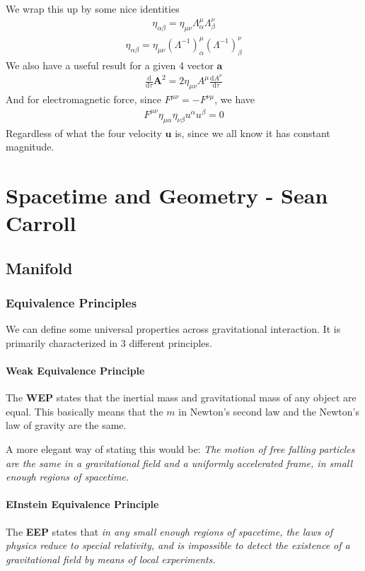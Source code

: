 \documentclass[12pt]{book}
\newcommand{\dydx}[2]{\frac{\text{d} #1}{\text{d} #2}}
\newcommand{\paren}[1]{\left( #1 \right)}
\newcommand{\etensor}[3]{#1_{#3}^{#2}}
\begin{document}
We wrap this up by some nice identities
\begin{align}
\eta_{\alpha\beta}=\eta_{\mu\nu}\etensor{\Lambda}{\mu}{\alpha}\etensor{\Lambda}{\nu}{\beta}
\end{align}
\begin{align}
\eta_{\alpha\beta}=\eta_{\mu\nu}\etensor{\paren{\Lambda^{-1}}}{\mu}{\alpha}\etensor{\paren{\Lambda^{-1}}}{\nu}{\beta}
\end{align}
We also have a useful result for a given 4 vector $\mathbf{a}$
\begin{align}
\dydx{}{\tau}\mathbf{A}^2 = 2\eta_{\mu\nu}A^{\mu}\dydx{A^{\nu}}{\tau}
\end{align}
And for electromagnetic force, since $F^{\mu\nu} = -F^{\nu\mu}$, we have
\begin{align}
F^{\mu\nu}\eta_{\mu\alpha}\eta_{\nu\beta}u^{\alpha}u^{\beta} = 0
\end{align}
Regardless of what the four velocity $\mathbf{u}$ is, since we all know it has constant magnitude. 


\chapter{Spacetime and Geometry - Sean Carroll}
\section{Manifold}
\subsection{Equivalence Principles}
We can define some universal properties across gravitational interaction. It is primarily characterized in 3 different principles.
\subsubsection{Weak Equivalence Principle}
The \textbf{WEP} states that the inertial mass and gravitational mass of any object are equal. This basically means that the $m$ in Newton's second law and the Newton's law of gravity are the same.

A more elegant way of stating this would be: \textit{The motion of free falling particles are the same in a gravitational field and a uniformly accelerated frame, in small enough regions of spacetime.}

\subsubsection{EInstein Equivalence Principle}
The \textbf{EEP} states that \textit{in any small enough regions of spacetime, the laws of physics reduce to special relativity, and is impossible to detect the existence of a gravitational field by means of local experiments.}
\end{document}
